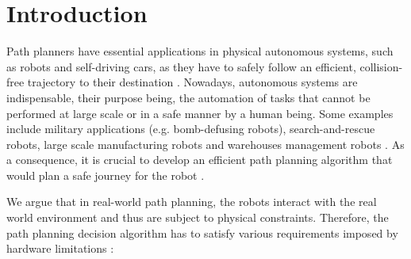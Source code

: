 



\chapter{Introduction}

Path planners have essential applications in physical autonomous systems, such as robots and self-driving cars, as they have to safely follow an efficient, collision-free trajectory to their destination \cite{inoue2019robot, gonzalez2016review}. Nowadays, autonomous systems are indispensable, their purpose being, the automation of tasks that cannot be performed at large scale or in a safe manner by a human being. Some examples include military applications (e.g. bomb-defusing robots), search-and-rescue robots, large scale manufacturing robots and warehouses management robots \cite{inoue2019robot}. As a consequence, it is crucial to develop an efficient path planning algorithm that would plan a safe journey for the robot \cite{gonzalez2016review}.

We argue that in real-world path planning, the robots interact with the real world environment and thus are subject to physical constraints. Therefore, the path planning decision algorithm has to satisfy various requirements imposed by hardware limitations \cite{lavalle2001randomized}: 

